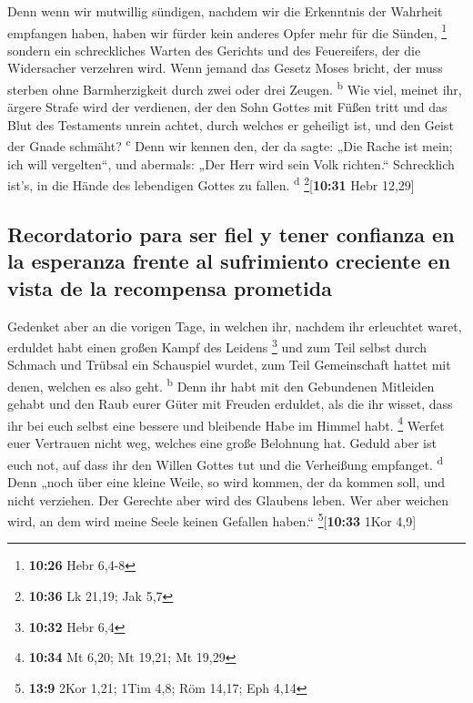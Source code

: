  Denn wenn wir mutwillig sündigen, nachdem wir die
Erkenntnis der Wahrheit empfangen haben, haben wir fürder kein anderes
Opfer mehr für die Sünden, \footnote{\textbf{10:26} Hebr 6,4-8}
 sondern ein schreckliches Warten des Gerichts und des
Feuereifers, der die Widersacher verzehren wird.  Wenn
jemand das Gesetz Moses bricht, der muss sterben ohne Barmherzigkeit
durch zwei oder drei Zeugen. \textsuperscript{b}  Wie
viel, meinet ihr, ärgere Strafe wird der verdienen, der den Sohn Gottes
mit Füßen tritt und das Blut des Testaments unrein achtet, durch welches
er geheiligt ist, und den Geist der Gnade schmäht? \textsuperscript{c}
 Denn wir kennen den, der da sagte: „Die Rache ist mein;
ich will vergelten``, und abermals: „Der Herr wird sein Volk richten.``
 Schrecklich ist's, in die Hände des lebendigen Gottes zu
fallen. \textsuperscript{d} \footnote{\textbf{10:36} Lk 21,19; Jak 5,7}{[}\textbf{10:31}
Hebr 12,29{]}

\hypertarget{recordatorio-para-ser-fiel-y-tener-confianza-en-la-esperanza-frente-al-sufrimiento-creciente-en-vista-de-la-recompensa-prometida}{%
\subsection{Recordatorio para ser fiel y tener confianza en la esperanza
frente al sufrimiento creciente en vista de la recompensa
prometida}\label{recordatorio-para-ser-fiel-y-tener-confianza-en-la-esperanza-frente-al-sufrimiento-creciente-en-vista-de-la-recompensa-prometida}}

 Gedenket aber an die vorigen Tage, in welchen ihr,
nachdem ihr erleuchtet waret, erduldet habt einen großen Kampf des
Leidens \footnote{\textbf{10:32} Hebr 6,4}  und zum Teil
selbst durch Schmach und Trübsal ein Schauspiel wurdet, zum Teil
Gemeinschaft hattet mit denen, welchen es also geht. \textsuperscript{b}
 Denn ihr habt mit den Gebundenen Mitleiden gehabt und
den Raub eurer Güter mit Freuden erduldet, als die ihr wisset, dass ihr
bei euch selbst eine bessere und bleibende Habe im Himmel habt.
\footnote{\textbf{10:34} Mt 6,20; Mt 19,21; Mt 19,29} 
Werfet euer Vertrauen nicht weg, welches eine große Belohnung hat.
 Geduld aber ist euch not, auf dass ihr den Willen Gottes
tut und die Verheißung empfanget. \textsuperscript{d} 
Denn „noch über eine kleine Weile, so wird kommen, der da kommen soll,
und nicht verziehen.  Der Gerechte aber wird des Glaubens
leben. Wer aber weichen wird, an dem wird meine Seele keinen Gefallen
haben.`` \footnote{\textbf{13:9} 2Kor 1,21; 1Tim 4,8; Röm 14,17; Eph
  4,14}{[}\textbf{10:33} 1Kor 4,9{]}

